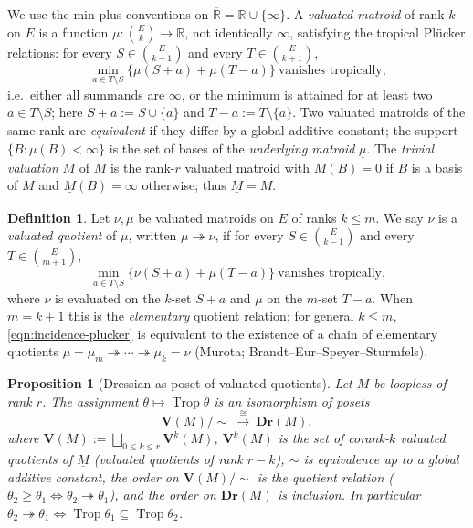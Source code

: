 \documentclass{article}
\newtheorem{proposition}[theorem]{Proposition}
\theoremstyle{definition}
\newtheorem{definition}[theorem]{Definition}
\newcommand{\Rbar}{\overline{\mathbb{R}}}
\newcommand{\R}{\mathbb{R}}
\newcommand{\Trop}{\operatorname{Trop}}
\newcommand{\onto}{\twoheadrightarrow}
\newcommand{\Dr}{\mathbf{Dr}}
\newcommand{\bV}{\mathbf V}
\begin{document}
We use the min-plus conventions on $\Rbar=\R\cup\{\infty\}$. A \emph{valuated matroid} of rank $k$ on
$E$ is a function $\mu\colon\binom{E}{k}\to\Rbar$, not identically $\infty$, satisfying the tropical
Pl\"ucker relations: for every $S\in\binom{E}{k-1}$ and every $T\in\binom{E}{k+1}$,
\begin{equation}\label{eqn:plucker}
  \min_{a\in T\setminus S}\bigl\{\mu(S+a)+\mu(T-a)\bigr\}\ \text{vanishes tropically,}
\end{equation}
i.e.\ either all summands are $\infty$, or the minimum is attained for at least two
$a\in T\setminus S$; here $S+a:=S\cup\{a\}$ and $T-a:=T\setminus\{a\}$. Two valuated matroids of the
same rank are \emph{equivalent} if they differ by a global additive constant; the support
$\{B:\mu(B)<\infty\}$ is the set of bases of the \emph{underlying matroid} $\underline\mu$. The
\emph{trivial valuation} $\underline M$ of $M$ is the rank-$r$ valuated matroid with $\underline
M(B)=0$ if $B$ is a basis of $M$ and $\underline M(B)=\infty$ otherwise; thus $\underline{\underline
M}=M$.

\begin{definition}\label{def:quotient}
Let $\nu,\mu$ be valuated matroids on $E$ of ranks $k\le m$. We say $\nu$ is a \emph{valuated
quotient} of $\mu$, written $\mu\onto\nu$, if for every $S\in\binom{E}{k-1}$ and every
$T\in\binom{E}{m+1}$,
\begin{equation}\label{eqn:incidence-plucker}
  \min_{a\in T\setminus S}\bigl\{\nu(S+a)+\mu(T-a)\bigr\}\ \text{vanishes tropically,}
\end{equation}
where $\nu$ is evaluated on the $k$-set $S+a$ and $\mu$ on the $m$-set $T-a$. When $m=k+1$ this is
the \emph{elementary} quotient relation; for general $k\le m$, \eqref{eqn:incidence-plucker} is
equivalent to the existence of a chain of elementary quotients $\mu=\mu_m\onto\cdots\onto\mu_k=\nu$
(Murota; Brandt--Eur--Speyer--Sturmfels).
\end{definition}

\begin{proposition}[Dressian as poset of valuated quotients]\label{fact:dressian}
Let $M$ be loopless of rank $r$. The assignment $\theta\mapsto\Trop\theta$ is an isomorphism of
posets
\[
  \bV(M)/\!\sim\ \xrightarrow{\ \cong\ }\ \Dr(M),
\]
where $\bV(M):=\bigsqcup_{0\le k\le r}\bV^{k}(M)$, $\bV^{k}(M)$ is the set of corank-$k$ valuated
quotients of $\underline M$ (valuated quotients of rank $r-k$), $\sim$ is equivalence up to a global
additive constant, the order on $\bV(M)/\!\sim$ is the quotient relation ($\theta_2\ge\theta_1\iff
\theta_2\onto\theta_1$), and the order on $\Dr(M)$ is inclusion. In particular $\theta_2\onto\theta_1
\iff\Trop\theta_1\subseteq\Trop\theta_2$.
\end{proposition}
\end{document}
